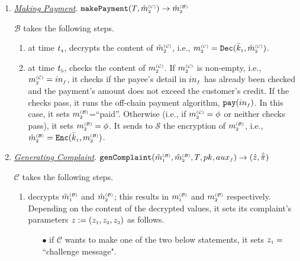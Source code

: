 \begin{enumerate}
\item\label{Making-Payment} \underline{\textit{Making Payment}}. $\mathtt{makePayment}(T, \hat m^{\scriptscriptstyle\mathcal{(C)}}_{\scriptscriptstyle2})\rightarrow \hat m^{\scriptscriptstyle\mathcal{(B)}}_{\scriptscriptstyle2}$

$\mathcal{B}$ takes the following steps. 
\begin{enumerate}
%
 \item at time $t_{\scriptscriptstyle 4}$, decrypts  the content of $\hat m_{\scriptscriptstyle 2}^{\scriptscriptstyle(\mathcal C)}$, i.e.,  $ m_{\scriptscriptstyle 2}^{\scriptscriptstyle(\mathcal{C})}= \mathtt{Dec}(\bar k_{\scriptscriptstyle 1}, \hat m_{\scriptscriptstyle 2}^{\scriptscriptstyle(\mathcal C)})$.
 \item at time $t_{\scriptscriptstyle 5}$, checks the content of $m_{\scriptscriptstyle 2}^{\scriptscriptstyle(\mathcal C)}$. If $m_{\scriptscriptstyle 2}^{\scriptscriptstyle(\mathcal C)}$ is non-empty, i.e., $m_{\scriptscriptstyle 2}^{\scriptscriptstyle(\mathcal C)}=in_{\scriptscriptstyle f}$, it checks if the payee's detail in $in_{\scriptscriptstyle f}$ has already been checked and the payment's amount does not exceed the customer's credit. If the checks pass, it  runs the off-chain payment algorithm, $\mathtt{pay}(in_{\scriptscriptstyle f})$.  In this case, it sets $m_{\scriptscriptstyle 2}^{\scriptscriptstyle(\mathcal B)}$=``paid''. Otherwise (i.e., if $m_{\scriptscriptstyle 2}^{\scriptscriptstyle(\mathcal C)}=\phi$ or neither checks pass), it sets $m_{\scriptscriptstyle 2}^{\scriptscriptstyle(\mathcal B)}=\phi$. It sends  to $\mathcal{S}$ the encryption of  $m_{\scriptscriptstyle 2}^{\scriptscriptstyle(\mathcal B)}$, i.e., $\hat m_{\scriptscriptstyle 2}^{\scriptscriptstyle(\mathcal{B})}= \mathtt{Enc}(\bar k_{\scriptscriptstyle 1}, m_{\scriptscriptstyle 2}^{\scriptscriptstyle(\mathcal B)})$.  %
\end{enumerate}
%

\item\label{Generating-Complaint}  \underline{\textit{Generating Complaint}}. $\mathtt{genComplaint}(\hat m^{\scriptscriptstyle\mathcal{(B)}}_{\scriptscriptstyle 1}, \hat m^{\scriptscriptstyle\mathcal{(B)}}_{\scriptscriptstyle2}, T, pk, {aux}_{\scriptscriptstyle f})\rightarrow  (\hat z, \hat{\ddot \pi})$

$\mathcal{C}$ takes the following steps. 
\begin{enumerate}
%
\item\label{DR::C-sends-complaint} decrypts $ \hat m^{\scriptscriptstyle\mathcal{(B)}}_{\scriptscriptstyle 1}$ and $\hat m^{\scriptscriptstyle\mathcal{(B)}}_{\scriptscriptstyle2}$; this results in $  m^{\scriptscriptstyle\mathcal{(B)}}_{\scriptscriptstyle 1}$ and $ m^{\scriptscriptstyle\mathcal{(B)}}_{\scriptscriptstyle2}$ respectively. Depending on the content of  the decrypted values, it sets its complaint's parameters $z:=(z_{\scriptscriptstyle 1}, z_{\scriptscriptstyle 2}, z_{\scriptscriptstyle 3})$ as follows.  %

\begin{itemize}
%
%
 \item  [$\bullet$] if $\mathcal{C}$ wants to make one of the two below statements, it sets  $z_{\scriptscriptstyle 1}=$``challenge message".
 

\end{itemize}
\end{enumerate}
\end{enumerate}
